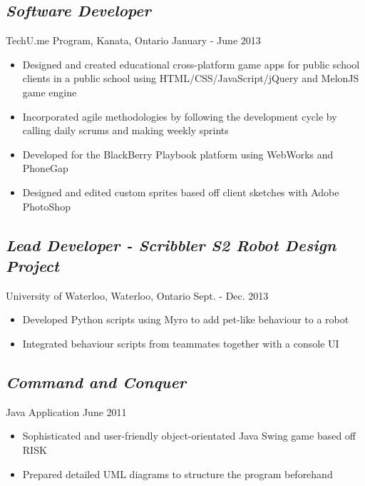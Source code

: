 \documentclass[10pt]{article}
\begin{document}
\begin{minipage}[t]{0.84\linewidth}
	\subsection*{\textit{Software Developer}} \vspace{-6pt} 
		TechU.me Program, Kanata, Ontario \hspace{170pt} January - June 2013
		\begin{itemize}
			\item Designed and created educational cross-platform game apps for public school clients in a public school using HTML/CSS/JavaScript/jQuery and MelonJS game engine
			\item Incorporated agile methodologies by following the development cycle by calling daily scrums and making weekly sprints
			\item Developed for the BlackBerry Playbook platform using WebWorks and PhoneGap
			\item Designed and edited custom sprites based off client sketches with Adobe PhotoShop
		\end{itemize}
	
	\subsection*{\textit{Lead Developer - Scribbler S2 Robot Design Project}} \vspace{-6pt} 
		University of Waterloo, Waterloo, Ontario \hspace{160pt} Sept. - Dec. 2013
		\begin{itemize}
			\item Developed Python scripts using Myro to add pet-like behaviour to a robot 
			\item Integrated behaviour scripts from teammates together with a console UI
		\end{itemize}
		
	\subsection*{\textit{Command and Conquer}} \vspace{-6pt}
		Java Application \hspace{300pt} June 2011
		\begin{itemize}
			\item Sophisticated and user-friendly object-orientated Java Swing game based off RISK
			\item Prepared detailed UML diagrams to structure the program beforehand
		\end{itemize}
	

\end{minipage}
\end{document}
